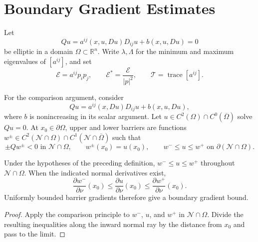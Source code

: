 \chapter{Boundary Gradient Estimates}

Let
\begin{equation}
Qu=a^{ij}(x,u,Du)D_{ij}u+b(x,u,Du)=0
\tag{14.1}
\end{equation}
be elliptic in a domain $\Omega\subset\mathbb R^n$. Write $\lambda,\Lambda$ for
the minimum and maximum eigenvalues of $[a^{ij}]$, and set
\[
\mathcal E=a^{ij}p_ip_j,\qquad
\mathcal E^*=\frac{\mathcal E}{|p|^2},\qquad
\mathcal T=\operatorname{trace}[a^{ij}].
\]

\begin{definition}
\label{gt14-def-boundary-barriers}
For the comparison argument, consider
\begin{equation}
Qu=a^{ij}(x,Du)D_{ij}u+b(x,u,Du),
\tag{14.2}
\end{equation}
where $b$ is nonincreasing in its scalar argument. Let
$u\in C^2(\Omega)\cap C^0(\overline\Omega)$ solve $Qu=0$. At
$x_0\in\partial\Omega$, upper and lower barriers are functions
$w^\pm\in C^2(\mathcal N\cap\Omega)\cap C^1(\mathcal N\cap\overline\Omega)$
such that
\[
\pm Qw^\pm<0\text{ in }\mathcal N\cap\Omega,\qquad
w^\pm(x_0)=u(x_0),\qquad
w^-\leq u\leq w^+\text{ on }\partial(\mathcal N\cap\Omega).
\]
\end{definition}

\begin{proposition}
\label{gt14-prop-barrier-derivative-comparison}
Under the hypotheses of the preceding definition,
$w^-\leq u\leq w^+$ throughout $\mathcal N\cap\Omega$. When the indicated
normal derivatives exist,
\begin{equation}
\frac{\partial w^-}{\partial\nu}(x_0)
\leq\frac{\partial u}{\partial\nu}(x_0)
\leq\frac{\partial w^+}{\partial\nu}(x_0).
\tag{14.3}
\end{equation}
Uniformly bounded barrier gradients therefore give a boundary gradient bound.
\end{proposition}
\begin{proof}
\sketch Apply the comparison principle to $w^-$, $u$, and $w^+$ in
$\mathcal N\cap\Omega$. Divide the resulting inequalities along the inward
normal ray by the distance from $x_0$ and pass to the limit.
\end{proof}

